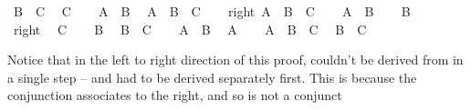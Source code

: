 \begin{isabellebody}
\ {\isacharbackquoteopen}B\ {\isasymand}\ C{\isacharbackquoteclose}\ \isamarkupfalse%
\ {\isachardoublequoteopen}C{\isachardoublequoteclose}\isacommand{{\isachardot}{\isachardot}}\isamarkupfalse%
\isanewline
\ \ \isamarkupfalse%
\ {\isacharbackquoteopen}A\ {\isasymand}\ B{\isacharbackquoteclose}\ \isamarkupfalse%
\ {\isachardoublequoteopen}{\isacharparenleft}A\ {\isasymand}\ B{\isacharparenright}\ {\isasymand}\ C{\isachardoublequoteclose}\isacommand{{\isachardot}{\isachardot}}\isamarkupfalse%
\isanewline
{}\isamarkupfalse%
\isanewline
\ \ \isamarkupfalse%
\ right{\isacharcolon}\ {\isachardoublequoteopen}{\isacharparenleft}A\ {\isasymand}\ B{\isacharparenright}\ {\isasymand}\ C{\isachardoublequoteclose}\isanewline
\ \ \isamarkupfalse%
\ {\isachardoublequoteopen}A\ {\isasymand}\ B{\isachardoublequoteclose}\isacommand{{\isachardot}{\isachardot}}\isamarkupfalse%
\isanewline
\ \ \isamarkupfalse%
\ {\isachardoublequoteopen}B{\isachardoublequoteclose}\isacommand{{\isachardot}{\isachardot}}\isamarkupfalse%
\isanewline
\ \ \isamarkupfalse%
\ right\ \isamarkupfalse%
\ {\isachardoublequoteopen}C{\isachardoublequoteclose}\isacommand{{\isachardot}{\isachardot}}\isamarkupfalse%
\isanewline
\ \ \isamarkupfalse%
\ {\isacharbackquoteopen}B{\isacharbackquoteclose}\ \isamarkupfalse%
\ {\isachardoublequoteopen}B\ {\isasymand}\ C{\isachardoublequoteclose}\isacommand{{\isachardot}{\isachardot}}\isamarkupfalse%
\isanewline
\ \ \isamarkupfalse%
\ {\isacharbackquoteopen}A\ {\isasymand}\ B{\isacharbackquoteclose}\ \isamarkupfalse%
\ {\isachardoublequoteopen}A{\isachardoublequoteclose}\isacommand{{\isachardot}{\isachardot}}\isamarkupfalse%
\isanewline
\ \ \isamarkupfalse%
\ {\isachardoublequoteopen}A\ {\isasymand}\ B\ {\isasymand}\ C{\isachardoublequoteclose}\ \isamarkupfalse%
\ {\isacharbackquoteopen}B\ {\isasymand}\ C{\isacharbackquoteclose}\isacommand{{\isachardot}{\isachardot}}\isamarkupfalse%
\isanewline
{}\isamarkupfalse%
%
\endisatagproof
{\isafoldproof}%
%
\isadelimproof
%
\endisadelimproof
%
\begin{isamarkuptext}%
Notice that in the left to right direction of this proof,  couldn't be derived
from  in a single step --  and  had to be derived separately
first. This is because the conjunction associates to the right, and so  is not a conjunct

\end{isamarkuptext}
\end{isabellebody}

